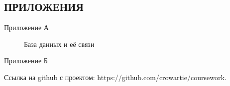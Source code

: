 \documentclass[12pt, oldlfont, amsfonts]{report}
\begin{document}
\begin{center}
\chapter*{\large{ПРИЛОЖЕНИЯ}}
\end{center}
\vspace{-1cm}
\begin{flushright}
    Приложение А
\end{flushright}

\begin{figure}[h!]
\caption{База данных и её связи}
\label{fig:БД.jpg}
\end{figure}
\begin{flushright}
    Приложение Б
\end{flushright}
Ссылка на github с проектом: https://github.com/crowartie/coursework.
    
\end{document}
